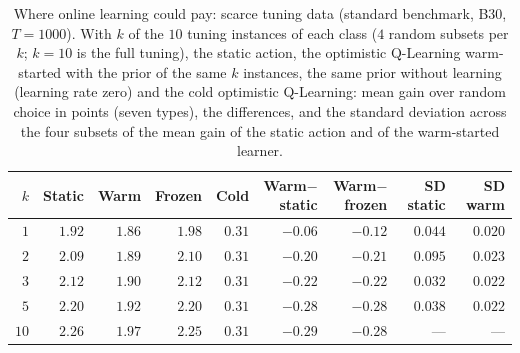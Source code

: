\begin{table}[t]
\caption{Where online learning could pay: scarce tuning data (standard benchmark, B30, $T=1000$). With $k$ of the $10$ tuning instances of each class ($4$ random subsets per $k$; $k=10$ is the full tuning), the static action, the optimistic Q-Learning warm-started with the prior of the same $k$ instances, the same prior without learning (learning rate zero) and the cold optimistic Q-Learning: mean gain over random choice in points (seven types), the differences, and the standard deviation across the four subsets of the mean gain of the static action and of the warm-started learner.}
\label{tab:scarce}
\centering
{\scriptsize\setlength{\tabcolsep}{3.5pt}
\begin{tabular}{@{}rrrrrrrrr@{}}
\toprule
$k$ & Static & Warm & Frozen & Cold & Warm$-$static & Warm$-$frozen & SD static & SD warm \\
\midrule
$1$ & $1.92$ & $1.86$ & $1.98$ & $0.31$ & $-0.06$ & $-0.12$ & $0.044$ & $0.020$ \\
$2$ & $2.09$ & $1.89$ & $2.10$ & $0.31$ & $-0.20$ & $-0.21$ & $0.095$ & $0.023$ \\
$3$ & $2.12$ & $1.90$ & $2.12$ & $0.31$ & $-0.22$ & $-0.22$ & $0.032$ & $0.022$ \\
$5$ & $2.20$ & $1.92$ & $2.20$ & $0.31$ & $-0.28$ & $-0.28$ & $0.038$ & $0.022$ \\
$10$ & $2.26$ & $1.97$ & $2.25$ & $0.31$ & $-0.29$ & $-0.28$ & --- & --- \\
\bottomrule
\end{tabular}}
\end{table}
